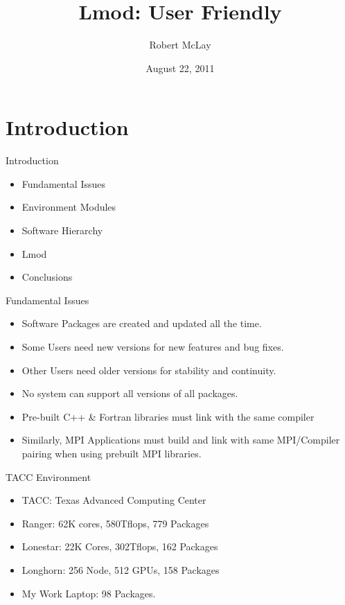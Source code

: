 \documentclass{beamer}
\title{Lmod: User Friendly}
\author{Robert McLay}
\institute{The Texas Advanced Computing Center}
\date{August 22, 2011}  %
\begin{document}
\begin{frame}
  \titlepage
\end{frame}

\section{Introduction}

\begin{frame}{Introduction}
  \begin{itemize}
    \item Fundamental Issues
    \item Environment Modules
    \item Software Hierarchy
    \item Lmod
    \item Conclusions
  \end{itemize}
\end{frame}


\begin{frame}{Fundamental Issues}
  \begin{itemize}
    \item Software Packages are created and updated all the time.
    \item Some Users need new versions for new features and bug fixes.
    \item Other Users need older versions for stability and continuity.
    \item No system can support all versions of all packages.
    \item Pre-built C++ \& Fortran libraries must link with the same compiler
    \item Similarly, MPI Applications must build and link with same
      MPI/Compiler pairing when using prebuilt MPI libraries.
  \end{itemize}
\end{frame}

\begin{frame}{TACC Environment}
  \begin{itemize}
    \item TACC: Texas Advanced Computing Center
    \item Ranger: 62K cores, 580Tflops, 779 Packages
    \item Lonestar: 22K Cores, 302Tflops, 162 Packages
    \item Longhorn: 256 Node, 512 GPUs, 158 Packages
    \item My Work Laptop: 98 Packages.
  \end{itemize}
\end{frame}
\end{document}
